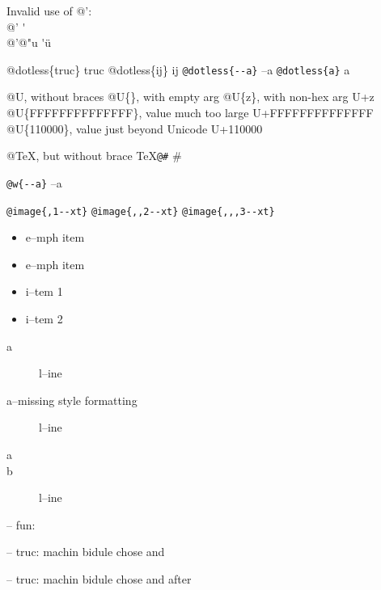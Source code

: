 \documentclass{book}
\begin{document}
Invalid use of @':\leavevmode{}\\
@' \'{}
\leavevmode{}\\
@'@"u \'{}\"{u}

@dotless\{truc\} truc
@dotless\{ij\} ij
\texttt{@dotless\{{-}{-}a\}} --a
\texttt{@dotless\{a\}} a

@U, without braces @U\{\}, with empty arg 
@U\{z\}, with non-hex arg U+z
@U\{FFFFFFFFFFFFFF\}, value much too large U+FFFFFFFFFFFFFF
@U\{110000\}, value just beyond Unicode U+110000

@TeX, but without brace \TeX{}\texttt{@\#} \#

\texttt{@w\{{-}{-}a\}} \hbox{--a}

\texttt{@image\{,1{-}{-}xt\}} 
\texttt{@image\{,,2{-}{-}xt\}} 
\texttt{@image\{,,,3{-}{-}xt\}} 


\begin{itemize}[label=\emph{}]
\item e--mph item
\end{itemize}

\begin{itemize}[label=\emph{} after emph]
\item e--mph item
\end{itemize}

\begin{itemize}[label=\textbullet{} a--n itemize line]
\item i--tem 1
\item i--tem 2
\end{itemize}

\begin{description}
\item[a]
l--ine
\end{description}

\begin{description}
\item[a--missing style formatting]
l--ine
\end{description}

\begin{description}
\item[a]
%
%
\item[b]
%
l--ine
\end{description}

\hbox{}-- fun: 


\hbox{}-- truc: machin bidule chose and


%
\hbox{}-- truc: machin bidule chose and  after
\end{document}
